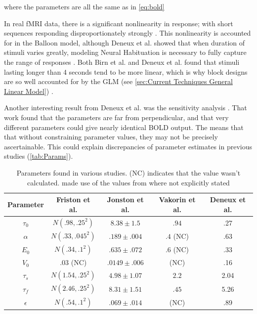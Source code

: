 where the parameters are all the same as in \autoref{eq:bold}

In real \ac{fMRI} data, there is a significant nonlinearity in response; with short sequences
responding disproportionately strongly \cite{Birn2001, Wager2005, Deneux2006}.
This nonlinearity is accounted for in the Balloon model, although Deneux et al.
showed that when duration of stimuli varies greatly,
modeling Neural Habituation is necessary to fully capture the range of responses \cite{Deneux2006}. 
Both Birn et al. and Deneux et al. found that 
stimuli lasting longer than 4 seconds 
tend to be more linear, which is why block designs are so well accounted for
by the \ac{GLM} (see \autoref{sec:Current Techniques General Linear Model})
\cite{Birn2001, Deneux2006}.

Another interesting result from Deneux et al. was the sensitivity analysis \cite{Deneux2006}.
That work found that the parameters are far from perpendicular,
and that very different parameters could give nearly identical \ac{BOLD} output.
The means that that without constraining parameter values, they may not be 
precisely ascertainable. This could explain discrepancies of parameter estimates
in previous studies (\autoref{tab:Params}).

\begin{table}[t]
\centering
\begin{tabular}{|c || c | c | c | c|}
\hline 
Parameter  & Friston et al. \cite{Friston2000} & Jonston et al. \cite{Johnston2007} 
    & Vakorin et al. \cite{Vakorin2007} & Deneux et al. \cite{Deneux2006}\\
\hline
$\tau_0  $ &  $N(.98 , .25^2)$  & $8.38 \pm 1.5  $ & $.94$ & .27\\
$\alpha  $ &  $N(.33 , .045^2)$  & $.189 \pm .004 $ & $.4$ (NC) & .63 \\
$E_0     $ &  $N(.34 , .1 ^2)$  & $.635 \pm .072 $ & $.6$ (NC) & .33\\
$V_0     $ &  $.03$ (NC)        & $.0149 \pm .006$ & (NC) & .16\\
$\tau_s  $ &  $N(1.54, .25^2)$  & $4.98 \pm 1.07 $ & $2.2$ & 2.04 \\
$\tau_f  $ &  $N(2.46, .25^2)$  & $8.31 \pm 1.51 $ & $.45$ & 5.26\\
$\epsilon$ &  $N(.54 , .1 ^2)$  & $.069 \pm .014 $ & (NC) & .89\\
\hline
\end{tabular}
\caption{Parameters found in various studies. (NC) indicates that the value
wasn't calculated. \cite{Vakorin2007} made use of the values from \cite{Friston2000}
where not explicitly stated}
\label{tab:Params} 
\end{table}

